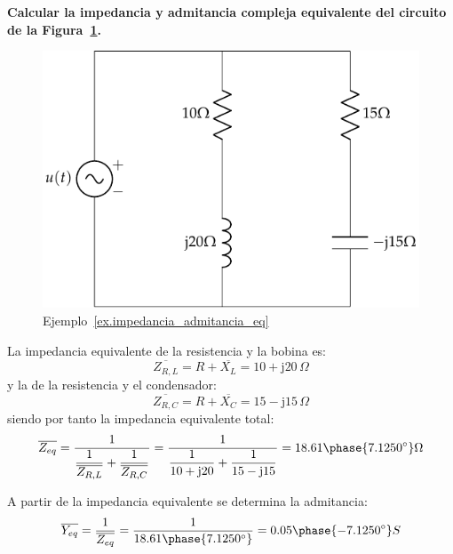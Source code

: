 	\begin{example}\label{ex.impedancia_admitancia_eq}
	    \textbf{Calcular la impedancia y admitancia compleja equivalente del circuito de la Figura~\ref{fig.impedancia_admitancia_eq}.}
	    \begin{figure}[H]
	        \centering
	        \includegraphics{../figs/impedancia_admitancia_eq.pdf}
	        \caption{Ejemplo~\ref{ex.impedancia_admitancia_eq}}
	        \label{fig.impedancia_admitancia_eq}
	    \end{figure}
	    
	    La impedancia equivalente de la resistencia y la bobina es:
	    \begin{equation*}
	        \overline{Z_{R,L}}=R+\overline{X_L}=10+\mathrm{j}20\,\Omega
	    \end{equation*}
	    y la de la resistencia y el condensador: 
	    \begin{equation*}
	        \overline{Z_{R,C}}=R+\overline{X_C}=15-\mathrm{j}15\,\Omega
	    \end{equation*}
	    siendo por tanto la impedancia equivalente total: 
	    \begin{equation*}
	        \overline{Z_{eq}}=\dfrac{1}{\dfrac{1}{\overline{Z_{R,L}}}+\dfrac{1}{\overline{Z_{R,C}}}}= \dfrac{1}{\dfrac{1}{10+\mathrm{j}20}+\dfrac{1}{15-\mathrm{j}15}}=18.61\phase{7.1250^\circ}\Omega
	    \end{equation*}
	    
	    A partir de la impedancia equivalente se determina la admitancia: 
	    \begin{equation*}
	        \overline{Y_{eq}}=\dfrac{1}{\overline{Z_{eq}}}=\dfrac{1}{18.61\phase{7.1250^\circ}}=0.05\phase{-7.1250^\circ} S
	    \end{equation*}
	\end{example}
	
